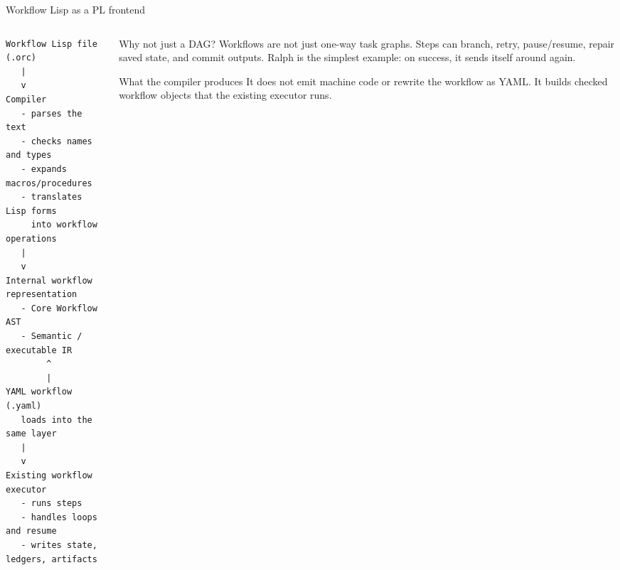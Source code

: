 \documentclass[aspectratio=169]{beamer}
\begin{document}
\begin{frame}[fragile]{Workflow Lisp as a PL frontend}
\begin{columns}[T,totalwidth=\textwidth]
\begin{column}{0.58\textwidth}
\begin{lstlisting}[basicstyle=\ttfamily\tiny,frame=none,backgroundcolor=\color{white}]
Workflow Lisp file
(.orc)
   |
   v
Compiler
   - parses the text
   - checks names and types
   - expands macros/procedures
   - translates Lisp forms
     into workflow operations
   |
   v
Internal workflow representation
   - Core Workflow AST
   - Semantic / executable IR
        ^
        |
YAML workflow (.yaml)
   loads into the same layer
   |
   v
Existing workflow executor
   - runs steps
   - handles loops and resume
   - writes state, ledgers, artifacts
\end{lstlisting}
\end{column}
\begin{column}{0.38\textwidth}
\begin{block}{Why not just a DAG?}
\scriptsize
Workflows are not just one-way task graphs. Steps can branch, retry, pause/resume, repair saved state, and commit outputs. Ralph is the simplest example: on success, it sends itself around again.
\end{block}
\vspace{0.1em}
\begin{block}{What the compiler produces}
\scriptsize
It does not emit machine code or rewrite the workflow as YAML. It builds checked workflow objects that the existing executor runs.
\end{block}
\end{column}
\end{columns}
\end{frame}
\end{document}

